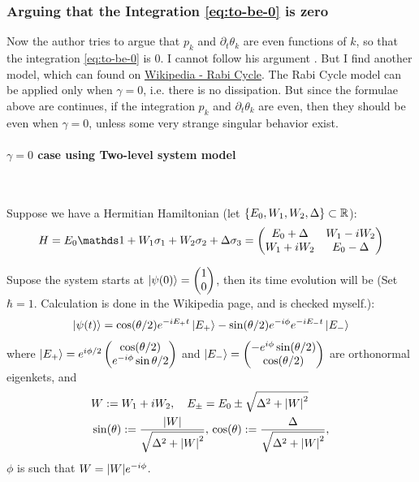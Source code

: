 \documentclass{article}
\begin{document}
\subsubsection{Arguing that the Integration \ref{eq:to-be-0} is zero}
\label{sec:Argument-1}

Now the author tries to argue that $p_k$ and $\partial_t\theta_k$ are
even functions of $k$, so that the integration \ref{eq:to-be-0} is $0$.
I cannot follow his argument
\label{confusion:3}. But I find another model, which can found on
\href{https://en.wikipedia.org/wiki/Rabi_cycle}{Wikipedia - Rabi
Cycle}. The Rabi Cycle model can be applied only when $\gamma=0$, i.e.
there is no dissipation. But since the formulae above are continues,
if the integration $p_k$ and $\partial_t\theta_k$ are even, then they
should be even when $\gamma=0$, unless some very strange singular
behavior exist.


\paragraph{$\gamma=0$ case using Two-level system model}$ $


Suppose we have a Hermitian Hamiltonian (let
$\{E_0,W_1,W_2,\Delta\}\subset\mathbb{R}$):
\begin{equation}
    H = E_0\id + W_1\sigma_1+W_2\sigma_2+\Delta\sigma_3 
    = \begin{pmatrix}
        E_0 + \Delta & W_1-iW_2 \\
        W_1+iW_2 & E_0 - \Delta
    \end{pmatrix}
\end{equation}

Supose the system starts at $\ket{\psi(0)}= \begin{pmatrix}
    1\\0
\end{pmatrix}$, then its time evolution will be (Set $\hbar=1$.
Calculation is done in the Wikipedia page, and is checked myself.):
\begin{equation}
    \label{eq:time-evolve-rabi}
    \ket{\psi(t)} = \cos(\theta/2)e^{-iE_+ t}\ket{E_+} - \sin(\theta/2)
    e^{-i\phi}e^{-iE_- t}\ket{E_-}
\end{equation}
where $\ket{E_+}=e^{i\phi/2} \begin{pmatrix}
    \cos(\theta/2) \\ e^{-i\phi}\sin{\theta/2}
\end{pmatrix}$ and $\ket{E_-}= \begin{pmatrix}
    -e^{i\phi}\sin(\theta/2) \\ \cos(\theta/2)
\end{pmatrix}$ are orthonormal eigenkets, and
\begin{align}
\begin{aligned}
    &W:= W_1+iW_2,\quad
    E_{\pm} = E_0\pm \sqrt{\Delta^2+\abs{W}^2}\\
    &\sin(\theta):= \frac{|W|}{\sqrt{\Delta^2+\abs{W}^2}},\,
    \cos(\theta):= \frac{\Delta}{\sqrt{\Delta^2+\abs{W}^2}},\,
\end{aligned}
\end{align}
$\phi$ is such that $W=\abs{W}e^{-i\phi}$.
\end{document}

